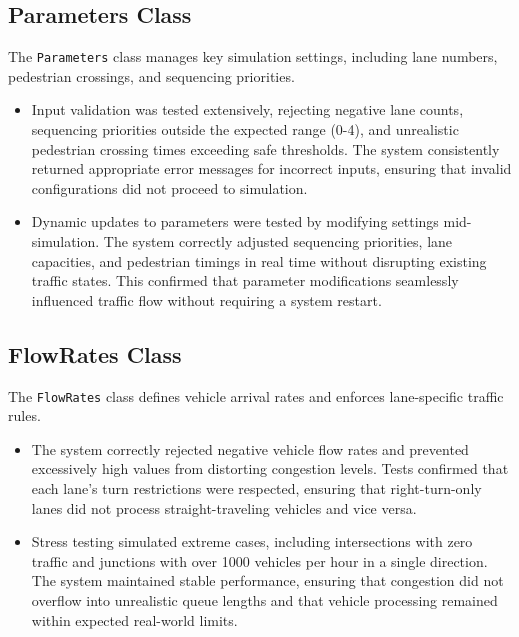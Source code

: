 \documentclass{article}
\begin{document}
    \subsection*{Parameters Class}
    The \texttt{Parameters} class manages key simulation settings, including lane numbers, pedestrian crossings, and sequencing priorities.
    \begin{itemize}
        \item Input validation was tested extensively, rejecting negative lane counts, sequencing priorities outside the expected range (0-4), and unrealistic pedestrian crossing times exceeding safe thresholds. The system consistently returned appropriate error messages for incorrect inputs, ensuring that invalid configurations did not proceed to simulation.
        \item Dynamic updates to parameters were tested by modifying settings mid-simulation. The system correctly adjusted sequencing priorities, lane capacities, and pedestrian timings in real time without disrupting existing traffic states. This confirmed that parameter modifications seamlessly influenced traffic flow without requiring a system restart.
    \end{itemize}

    \subsection*{FlowRates Class}
    The \texttt{FlowRates} class defines vehicle arrival rates and enforces lane-specific traffic rules.
    \begin{itemize}
        \item The system correctly rejected negative vehicle flow rates and prevented excessively high values from distorting congestion levels. Tests confirmed that each lane’s turn restrictions were respected, ensuring that right-turn-only lanes did not process straight-traveling vehicles and vice versa.
        \item Stress testing simulated extreme cases, including intersections with zero traffic and junctions with over 1000 vehicles per hour in a single direction. The system maintained stable performance, ensuring that congestion did not overflow into unrealistic queue lengths and that vehicle processing remained within expected real-world limits.
    \end{itemize}
\end{document}
